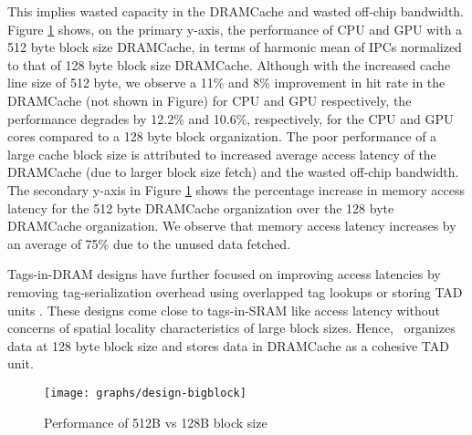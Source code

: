 This implies wasted capacity in the DRAMCache and wasted off-chip bandwidth. Figure \ref{fig:design-bigblock} shows, on the primary y-axis, the performance of CPU and GPU with a 512 byte block size DRAMCache, in terms of harmonic mean of IPCs normalized to that of 128 byte block size DRAMCache.
Although with the increased cache line size of 512 byte, we observe a 11\% and 8\% improvement in hit rate in the DRAMCache (not shown in Figure) for CPU and GPU respectively, the performance degrades by 12.2\% and 10.6\%, respectively, for the CPU and GPU cores compared to a 128 byte block organization. The poor performance of a large cache block size is attributed to increased average access latency of the DRAMCache (due to larger block size fetch) and the wasted off-chip bandwidth. The secondary y-axis in Figure \ref{fig:design-bigblock} shows the percentage increase in memory access latency for the 512 byte DRAMCache organization over the 128 byte DRAMCache organization. We observe that memory access latency increases by an average of 75\% due to the unused data fetched.
\par Tags-in-DRAM designs have further focused on improving access latencies by removing tag-serialization overhead using overlapped tag lookups \cite{loh-hill} or storing TAD units \cite{alloy}. These designs come close to tags-in-SRAM like access latency without concerns of spatial locality characteristics of large block sizes. 
Hence, \cachename\ organizes data at 128 byte block size and stores data in DRAMCache as a cohesive TAD unit.

\begin{figure}[htbp]
   \texttt{[image: graphs/design-bigblock]}
   \caption{Performance of 512B vs 128B block size}	
   \label{fig:design-bigblock}
\end{figure}

